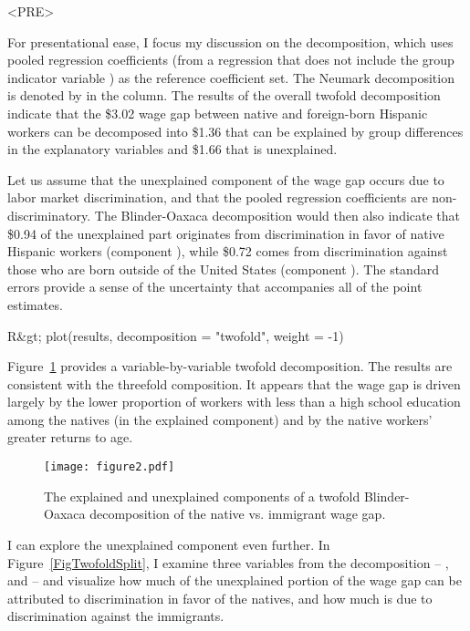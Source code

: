 <PRE>\documentclass[nojss]{jss}
\begin{document}
For presentational ease, I focus my discussion on the \citet{Neumark1988} decomposition, which uses pooled regression coefficients (from a regression that does not include the group indicator variable ) as the reference coefficient set. The Neumark decomposition is denoted by  in the  column. The results of the overall twofold decomposition indicate that the \$3.02 wage gap between native and foreign-born Hispanic workers can be decomposed into \$1.36 that can be explained by group differences in the explanatory variables and \$1.66 that is unexplained. 

Let us assume that the unexplained component of the wage gap occurs due to labor market discrimination, and that the pooled regression coefficients are non-discriminatory.  The Blinder-Oaxaca decomposition would then also indicate that \$0.94 of the unexplained part originates from discrimination in favor of native Hispanic workers (component ), while \$0.72 comes from discrimination against those who are born outside of the United States (component ). The standard errors provide a sense of the uncertainty that accompanies all of the point estimates.

\begin{CodeInput}
R&gt; plot(results, decomposition = "twofold", weight = -1)
\end{CodeInput}

Figure~\ref{FigTwofold} provides a variable-by-variable twofold decomposition. The results are consistent with the threefold composition. It appears that the wage gap is driven largely by the lower proportion of workers with less than a high school education among the natives (in the explained component) and by the native workers' greater returns to age.

\begin{figure}[htp!]
	\centering
	\texttt{[image: figure2.pdf]}
	\caption{The explained and unexplained components of a twofold Blinder-Oaxaca decomposition of the native vs. immigrant wage gap.}
	\label{FigTwofold}
\end{figure}

I can explore the unexplained component even further. In Figure~\ref{FigTwofoldSplit}, I examine three variables from the decomposition -- ,  and  -- and visualize how much of the unexplained portion of the wage gap can be attributed to discrimination in favor of the natives, and how much is due to discrimination against the immigrants.
\end{document}
